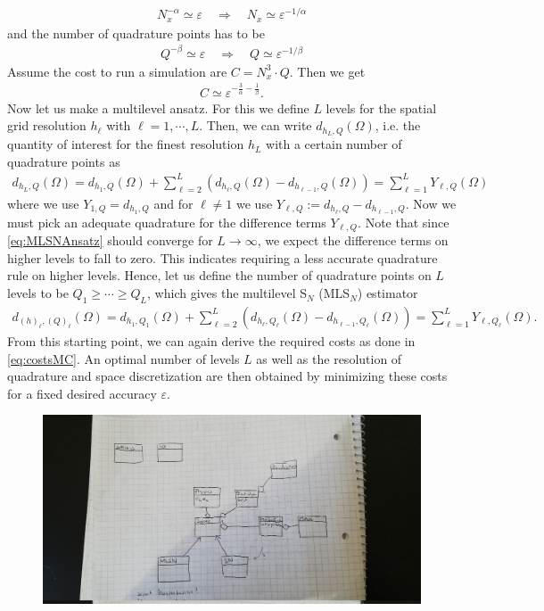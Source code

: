 \documentclass[10pt,a4paper]{article}
\begin{document}
\begin{align*}
N_x^{-\alpha} \simeq \varepsilon \quad \Rightarrow \quad N_x \simeq \varepsilon^{-1/\alpha}
\end{align*}
and the number of quadrature points has to be 
\begin{align*}
Q^{-\beta} \simeq \varepsilon \quad \Rightarrow \quad Q \simeq \varepsilon^{-1/\beta}
\end{align*}
Assume the cost to run a simulation are $C = N_x^3 \cdot Q$. Then we get
\begin{align}\label{eq:costsMC}
C \simeq \varepsilon^{-\frac{3}{\alpha} - \frac{1}{\beta}}.
\end{align} 
Now let us make a multilevel ansatz. For this we define $L$ levels for the spatial grid resolution $h_{\ell}$ with $\ell = 1,\cdots,L$. Then, we can write $d_{h_L,Q}(\Omega)$, i.e. the quantity of interest for the finest resolution $h_L$ with a certain number of quadrature points as
\begin{align}\label{eq:MLSNAnsatz}
d_{h_L,Q}(\Omega) = d_{h_1,Q}(\Omega) + \sum_{\ell = 2}^L \left( d_{h_{\ell},Q}(\Omega) - d_{h_{\ell-1},Q}(\Omega) \right) = \sum_{\ell = 1}^L Y_{\ell,Q}(\Omega)
\end{align}
where we use $Y_{1,Q} = d_{h_1,Q}$ and for $\ell\neq 1$ we use $Y_{\ell,Q} := d_{h_{\ell},Q} - d_{h_{\ell-1},Q}$. Now we must pick an adequate quadrature for the difference terms $Y_{\ell,Q}$. Note that since \eqref{eq:MLSNAnsatz} should converge for $L\rightarrow\infty$, we expect the difference terms on higher levels to fall to zero. This indicates requiring a less accurate quadrature rule on higher levels. Hence, let us define the number of quadrature points on $L$ levels to be $Q_{1} \geq \cdots \geq Q_{L}$, which gives the multilevel S$_N$ (MLS$_N$) estimator
\begin{align}\label{eq:MLSNEstimator}
d_{(h)_{\ell},(Q)_{\ell}}(\Omega) = d_{h_1,Q_1}(\Omega) + \sum_{\ell = 2}^L \left( d_{h_{\ell},Q_{\ell}}(\Omega) - d_{h_{\ell-1},Q_{\ell}}(\Omega) \right) = \sum_{\ell = 1}^L Y_{\ell,Q_{\ell}}(\Omega).
\end{align}
From this starting point, we can again derive the required costs as done in \eqref{eq:costsMC}. An optimal number of levels $L$ as well as the resolution of quadrature and space discretization are then obtained by minimizing these costs for a fixed desired accuracy $\varepsilon$.
\begin{figure}
\centering
\includegraphics[scale=0.25]{test.jpeg}
\end{figure}
\newpage
  

\end{document}
